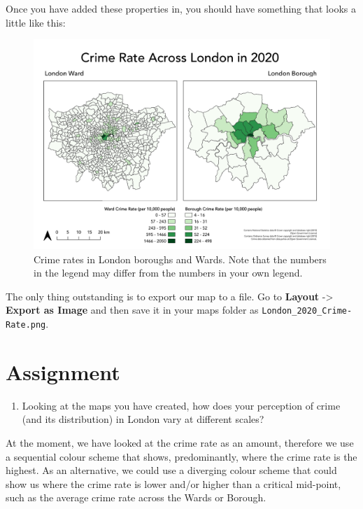 \documentclass[
]{book}
\providecommand{\tightlist}{%
  \setlength{\itemsep}{0pt}\setlength{\parskip}{0pt}}
\begin{document}
Once you have added these properties in, you should have something that looks a little like this:

\begin{figure}

{\centering \includegraphics[width=48.71in]{images/w03/london_crime_rate} 

}

\caption{Crime rates in London boroughs and Wards. Note that the numbers in the legend may differ from the numbers in your own legend.}\label{fig:03-finale-map}
\end{figure}

The only thing outstanding is to export our map to a file. Go to \textbf{Layout} -\textgreater{} \textbf{Export as Image} and then save it in your maps folder as \texttt{London\_2020\_Crime-Rate.png}.

\hypertarget{assignment-w03}{%
\section{Assignment}\label{assignment-w03}}

\begin{enumerate}
\def\labelenumi{\arabic{enumi}.}
\tightlist
\item
  Looking at the maps you have created, how does your perception of crime (and its distribution) in London vary at different scales?
\end{enumerate}

At the moment, we have looked at the crime rate as an amount, therefore we use a sequential colour scheme that shows, predominantly, where the crime rate is the highest. As an alternative, we could use a diverging colour scheme that could show us where the crime rate is lower and/or higher than a critical mid-point, such as the average crime rate across the Wards or Borough.
\end{document}
